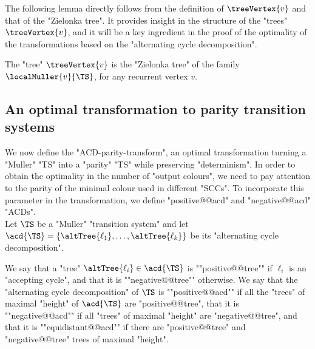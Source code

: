 \documentclass[10pt,a4paper]{amsart}
\begin{document}
The following lemma directly follows from the definition of $\treeVertex{v}$ and that of the "Zielonka tree". It provides insight in the structure of the "trees" $\treeVertex{v}$, and it will be a key ingredient in the proof of the optimality of the transformations based on the "alternating cycle decomposition".

\begin{lemma}\label{lemma-acd:tree_q_ZT_local_Muller}
	The "tree" $\treeVertex{v}$
	 is the "Zielonka tree" of the family $\localMuller{v}{\TS}$,\footnotemark{} for any recurrent vertex $v$.
\end{lemma}

\subsection{An optimal transformation to parity transition systems}\label{subsec-acd: parity-transformation}
We now define the "ACD-parity-transform", an optimal transformation turning a "Muller" "TS" into a "parity" "TS" while preserving "determinism". In order to obtain the optimality in the number of "output colours", we need to pay attention to the parity of the minimal colour used in different "SCCs". To incorporate this parameter in the transformation, we define "positive@@acd" and "negative@@acd" "ACDs".\\

Let $\TS$ be a "Muller" "transition system" and let $\acd{\TS} = \{\altTree{\ell_1},\dots, \altTree{\ell_k}\}$ be its "alternating cycle decomposition".


\AP We say that a "tree" $\altTree{\ell_i}\in \acd{\TS}$ is ""positive@@tree"" if $\ell_i$ is an "accepting cycle", and that it is ""negative@@tree"" otherwise.
\AP We say that the "alternating cycle decomposition" of $\TS$ is ""positive@@acd"" if all the "trees" of maximal "height" of $\acd{\TS}$ are "positive@@tree", that it is ""negative@@acd"" if all "trees" of maximal "height" are "negative@@tree", and that it is ""equidistant@@acd"" if there are "positive@@tree" and "negative@@tree" trees of maximal "height".
\end{document}
